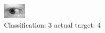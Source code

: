 \begin{figure}[h!]
\begin{center}
\includegraphics[width=0.60\columnwidth]{figures/ID769_class_3_target_4.png}
\end{center}
\caption{ Classification: 3 actual target: 4}
\label{fig:ID769_class_3_target_4}
\end{figure}
